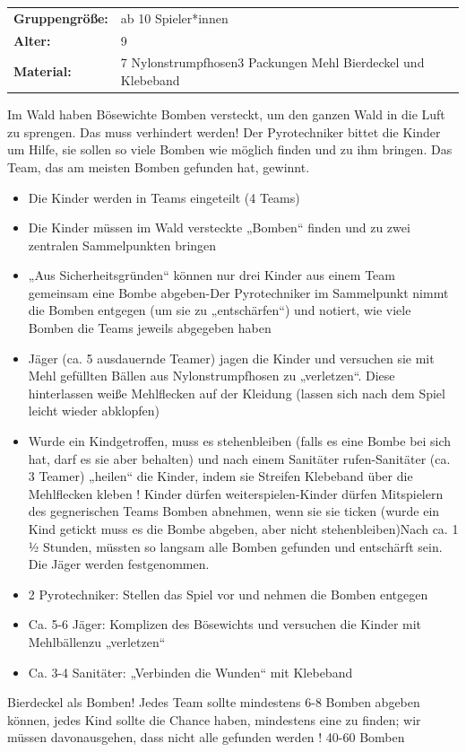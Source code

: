 \begin{table}[H]
\begin{tabular}{>{\bfseries}lp{8cm}}
   Gruppengröße:   & ab 10 Spieler*innen\\
    Alter: & 9 \\
    Material: & 7 Nylonstrumpfhosen3 Packungen Mehl Bierdeckel und Klebeband \\
\end{tabular}
\end{table} 
 Im Wald haben Bösewichte Bomben versteckt, um den ganzen Wald in die Luft zu sprengen. Das muss verhindert werden! Der Pyrotechniker bittet die Kinder um Hilfe, sie sollen so viele Bomben wie möglich finden und zu ihm bringen. Das Team, das am meisten Bomben gefunden hat, gewinnt.
    \begin{itemize}
        \item Die Kinder werden in Teams eingeteilt (4 Teams)
        \item Die Kinder müssen im Wald versteckte „Bomben“ finden und zu zwei zentralen Sammelpunkten bringen
        \item „Aus Sicherheitsgründen“ können nur drei Kinder aus einem Team gemeinsam eine Bombe abgeben-Der Pyrotechniker im Sammelpunkt nimmt die Bomben entgegen (um sie zu „entschärfen“) und notiert, wie viele Bomben die Teams jeweils abgegeben haben
        \item Jäger (ca. 5 ausdauernde Teamer) jagen die Kinder und versuchen sie mit Mehl gefüllten Bällen aus Nylonstrumpfhosen zu „verletzen“. Diese hinterlassen weiße Mehlflecken auf der Kleidung (lassen sich nach dem Spiel leicht wieder abklopfen)
        \item Wurde ein Kindgetroffen, muss es stehenbleiben (falls es eine Bombe bei sich hat, darf es sie aber behalten) und nach einem Sanitäter rufen-Sanitäter (ca. 3 Teamer) „heilen“ die Kinder, indem sie Streifen Klebeband über die  Mehlflecken kleben ! Kinder dürfen weiterspielen-Kinder dürfen Mitspielern des gegnerischen Teams Bomben abnehmen, wenn sie sie ticken (wurde ein Kind getickt muss es die Bombe abgeben, aber nicht stehenbleiben)Nach ca. 1 ½ Stunden, müssten so langsam alle Bomben gefunden und entschärft sein. Die Jäger werden festgenommen.
        \item 2 Pyrotechniker: Stellen das Spiel vor und nehmen die Bomben entgegen
        \item Ca. 5-6 Jäger: Komplizen des Bösewichts und versuchen die Kinder mit Mehlbällenzu „verletzen“
        \item Ca. 3-4 Sanitäter: „Verbinden die Wunden“ mit Klebeband
        \end{itemize}
    Bierdeckel als Bomben! Jedes Team sollte mindestens 6-8 Bomben abgeben können, jedes Kind sollte die Chance haben, mindestens eine zu finden; wir müssen davonausgehen, dass nicht alle gefunden werden ! 40-60 Bomben
    \\ \newline

